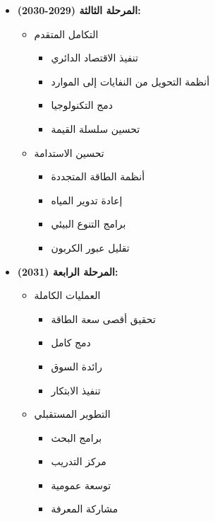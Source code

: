 \begin{itemize}
    \item \textbf{المرحلة الثالثة (2029-2030):}
    \begin{itemize}
        \item التكامل المتقدم
        \begin{itemize}
            \item تنفيذ الاقتصاد الدائري
            \item أنظمة التحويل من النفايات إلى الموارد
            \item دمج التكنولوجيا
            \item تحسين سلسلة القيمة
        \end{itemize}
        
        \item تحسين الاستدامة
        \begin{itemize}
            \item أنظمة الطاقة المتجددة
            \item إعادة تدوير المياه
            \item برامج التنوع البيئي
            \item تقليل عبور الكربون
        \end{itemize}
    \end{itemize}
    
    \item \textbf{المرحلة الرابعة (2031):}
    \begin{itemize}
        \item العمليات الكاملة
        \begin{itemize}
            \item تحقيق أقصى سعة الطاقة
            \item دمج كامل
            \item رائدة السوق
            \item تنفيذ الابتكار
        \end{itemize}
        
        \item التطوير المستقبلي
        \begin{itemize}
            \item برامج البحث
            \item مركز التدريب
            \item توسعة عمومية
            \item مشاركة المعرفة
        \end{itemize}
    \end{itemize}
\end{itemize}

